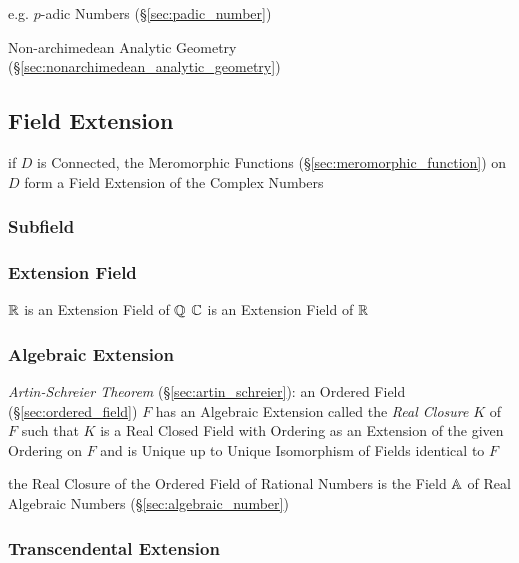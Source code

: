 e.g. $p$-adic Numbers (\S\ref{sec:padic_number})

\fist Non-archimedean Analytic Geometry
(\S\ref{sec:nonarchimedean_analytic_geometry})



\subsection{Field Extension}\label{sec:field_extension}

if $D$ is Connected, the Meromorphic Functions
(\S\ref{sec:meromorphic_function}) on $D$ form a Field Extension of the Complex
Numbers



\subsubsection{Subfield}\label{sec:subfield}

\subsubsection{Extension Field}\label{sec:extension_field}

$\mathbb{R}$ is an Extension Field of $\mathbb{Q}$
$\mathbb{C}$ is an Extension Field of $\mathbb{R}$



\subsubsection{Algebraic Extension}\label{sec:algebraic_extension}

\emph{Artin-Schreier Theorem} (\S\ref{sec:artin_schreier}): an Ordered Field
(\S\ref{sec:ordered_field}) $F$ has an Algebraic Extension called the
\emph{Real Closure} $K$ of $F$ such that $K$ is a Real Closed Field with
Ordering as an Extension of the given Ordering on $F$ and is Unique up to
Unique Isomorphism of Fields identical to $F$

the Real Closure of the Ordered Field of Rational Numbers is the Field $\mathbb{A}$
of Real Algebraic Numbers (\S\ref{sec:algebraic_number})



\subsubsection{Transcendental Extension}
\label{sec:transcendental_extension}



